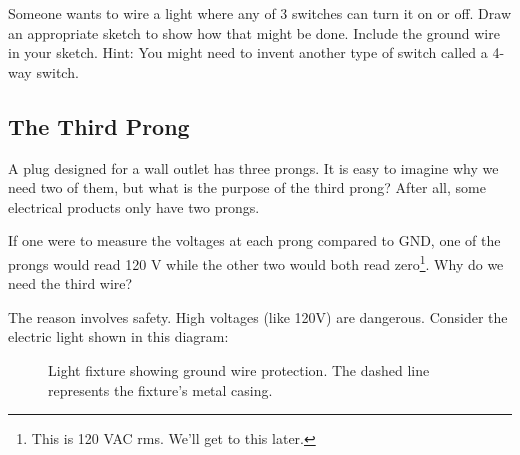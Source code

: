 \begin{clevel}
Someone wants to wire a light where any of 3 switches can turn it on or off. Draw an appropriate sketch to show how that might be done. Include the ground wire in your sketch. Hint: You might need to invent another type of switch called a 4-way switch.
\end{clevel}

\subsection{The Third Prong}
A plug designed for a wall outlet has three prongs. It is easy to imagine why we need two of them, but what is the purpose of the third prong? After all, some electrical products only have two prongs.\par

If one were to measure the voltages at each prong compared to GND, one of the prongs would read 120 V while the other two would both read zero\footnote{This is 120 VAC rms. We'll get to this later.}. Why do we need the third wire?\par

The reason involves safety. High voltages (like 120V) are dangerous. Consider the electric light shown in this diagram:

\par
\begin{figure}[H]
\begin{center}
\caption{Light fixture showing ground wire protection. The dashed line represents the fixture's metal casing.}
\label{F:23P}
\end{center}
\end{figure}

